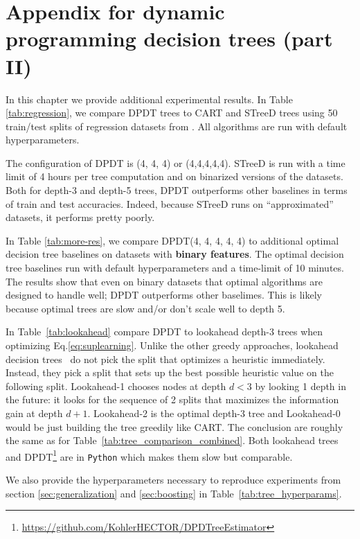 \chapter{Appendix for dynamic programming decision trees (part II)}
\label{chap-app-dpdt}
In this chapter we provide additional experimental results. In Table \ref{tab:regression}, we compare DPDT trees to CART and STreeD trees using 50 train/test splits of regression datasets from \cite{grinsztajn2022tree}. All algorithms are run with default hyperparameters. 

The configuration of DPDT is (4, 4, 4) or (4,4,4,4,4). STreeD is run with a time limit of 4 hours per tree computation and on binarized versions of the datasets. 
Both for depth-3 and depth-5 trees, DPDT outperforms other baselines in terms of train and test accuracies. Indeed, because STreeD runs on ``approximated'' datasets, it performs pretty poorly. 

In Table \ref{tab:more-res}, we compare DPDT(4, 4, 4, 4, 4) to additional optimal decision tree baselines on datasets with \textbf{binary features}. The optimal decision tree baselines run with default hyperparameters and a time-limit of 10 minutes. The results show that even on binary datasets that optimal algorithms are designed to handle well; DPDT outperforms other baselimes. This is likely because optimal trees are slow and/or don't scale well to depth 5.

In Table~\ref{tab:lookahead} compare DPDT to lookahead depth-3 trees when optimizing Eq.\ref{eq:suplearning}. Unlike the other greedy approaches, lookahead decision trees~\cite{lookahead} do not pick the split that optimizes a heuristic immediately. Instead, they pick a split that sets up the best possible heuristic value on the following split. Lookahead-1 chooses nodes at depth $d<3$ by looking 1 depth in the future: it looks for the sequence of 2 splits that maximizes the information gain at depth $d + 1$. Lookahead-2 is the optimal depth-3 tree and Lookahead-0 would be just building the tree greedily like CART. The conclusion are roughly the same as for Table~\ref{tab:tree_comparison_combined}. Both lookahead trees and DPDT\footnote{\url{https://github.com/KohlerHECTOR/DPDTreeEstimator}} are in \texttt{Python} which makes them slow but comparable.

We also provide the hyperparameters necessary to reproduce experiments from section \ref{sec:generalization} and \ref{sec:boosting} in Table~\ref{tab:tree_hyperparams}.


